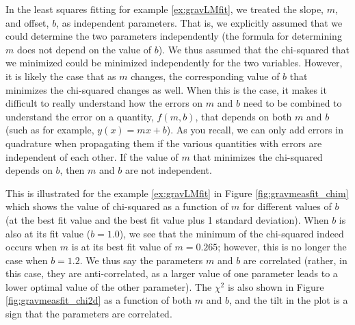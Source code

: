 In the least squares fitting for example \ref{ex:gravLMfit}, we treated the slope, $m$,  and offset, $b$, as independent parameters. That is, we explicitly assumed that we could determine the two parameters independently (the formula for determining $m$ does not depend on the value of $b$). We thus assumed that the chi-squared that we minimized could be minimized independently for the two variables. However, it is likely the case that as $m$ changes, the corresponding value of $b$ that minimizes the chi-squared changes as well. When this is the case, it makes it difficult to really understand how the errors on $m$ and $b$ need to be combined to understand the error on a quantity, $f(m,b)$, that depends on both $m$ and $b$ (such as for example, $y(x)=mx+b$). As you recall, we can only add errors in quadrature when propagating them if the various quantities with errors are independent of each other. If the value of $m$ that minimizes the chi-squared depends on $b$, then $m$ and $b$ are not independent.

This is illustrated for the example \ref{ex:gravLMfit} in Figure \ref{fig:gravmeasfit_chim} which shows the value of chi-squared as a function of $m$ for different values of $b$ (at the best fit value and the best fit value plus 1 standard deviation). When $b$ is also at its fit value ($b=1.0$), we see that the minimum of the chi-squared indeed occurs when $m$ is at its best fit value of $m=0.265$; however, this is no longer the case when $b=1.2$. We thus say the parameters $m$ and $b$ are correlated (rather, in this case, they are anti-correlated, as a larger value of one parameter leads to a lower optimal value of the other parameter). The $\chi^2$ is also shown in Figure \ref{fig:gravmeasfit_chi2d} as a function of both $m$ and $b$, and the tilt in the plot is a sign that the parameters are correlated.

